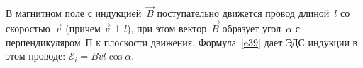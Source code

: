 \documentclass[main.tex]{subfiles}
\begin{document}
\begin{NoHyper}
В магнитном поле с индукцией~$\vec B$ поступательно движется провод длиной~$l$ со скоростью~$\vec v$ (причем $\vec v\perp l$), при этом вектор~$\vec B$ образует угол~$\alpha$ с перпендикуляром~П к плоскости движения. Формула~\eqref{e39} дает ЭДС индукции в этом проводе: $\mathscr E_i=Bvl\cos\alpha$. 






























\end{NoHyper}
\end{document}
